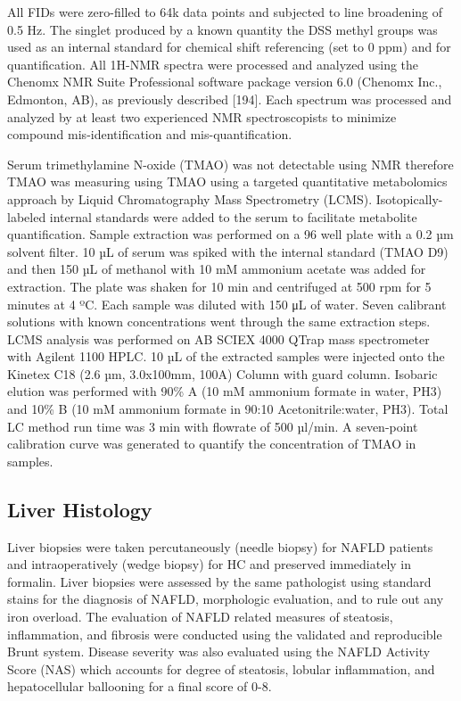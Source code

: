 All FIDs were zero-filled to 64k data points and subjected to line broadening of 0.5 Hz. The singlet produced by a known quantity the DSS methyl groups was used as an internal standard for chemical shift referencing (set to 0 ppm) and for quantification. All 1H-NMR spectra were processed and analyzed using the Chenomx NMR Suite Professional software package version 6.0 (Chenomx Inc., Edmonton, AB), as previously described [194].  Each spectrum was processed and analyzed by at least two experienced NMR spectroscopists to minimize compound mis-identification and mis-quantification.

Serum trimethylamine N-oxide (TMAO) was not detectable using NMR therefore TMAO was measuring using TMAO using a targeted quantitative metabolomics approach by Liquid Chromatography Mass Spectrometry (LCMS). Isotopically-labeled internal standards were added to the serum to facilitate metabolite quantification. Sample extraction was performed on a 96 well plate with a 0.2 µm solvent filter. 10 µL of serum was spiked with the internal standard (TMAO D9) and then 150 µL of methanol with 10 mM ammonium acetate was added for extraction. The plate was shaken for 10 min and centrifuged at 500 rpm for 5 minutes at 4 ºC. Each sample was diluted with 150 μL of water. Seven calibrant solutions with known concentrations went through the same extraction steps. LCMS analysis was performed on AB SCIEX 4000 QTrap mass spectrometer with Agilent 1100 HPLC. 10 µL of the extracted samples were injected onto the Kinetex C18 (2.6 µm, 3.0x100mm, 100A) Column with guard column. Isobaric elution was performed with 90\% A (10 mM ammonium formate in water, PH3) and 10\% B (10 mM ammonium formate in 90:10 Acetonitrile:water, PH3). Total LC method run time was 3 min with flowrate of 500 µl/min. A seven-point calibration curve was generated to quantify the concentration of TMAO in samples.

\subsection{Liver Histology}
Liver biopsies were taken percutaneously (needle biopsy) for NAFLD patients and intraoperatively (wedge biopsy) for HC and preserved immediately in formalin. Liver biopsies were assessed by the same pathologist using standard stains for the diagnosis of NAFLD, morphologic evaluation, and to rule out any iron overload. The evaluation of NAFLD related measures of steatosis, inflammation, and fibrosis were conducted using the validated and reproducible Brunt system. Disease severity was also evaluated using the NAFLD Activity Score (NAS) which accounts for degree of steatosis, lobular inflammation, and hepatocellular ballooning for a final score of 0-8.

